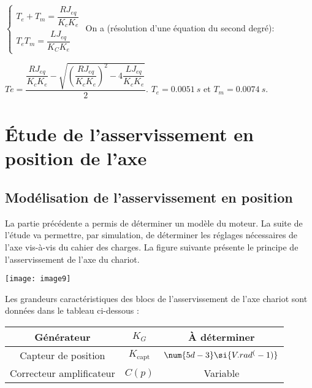 \begin{multicols}{2}
\ifprof
\begin{corrige}
$
\left\{
\begin{array}{l}
T_e+T_m= \dfrac{RJ_{eq}}{K_c K_e}\\
T_e T_m=\dfrac{LJ_{eq}}{K_C K_e}
\end{array}
\right.
$
On a (résolution d’une équation du second degré):

$Te=\dfrac{\dfrac{RJ_{eq}}{K_c K_e}-\sqrt{\left(\dfrac{RJ_{eq}}{K_c K_e}\right)^2 - 4\dfrac{LJ_{eq}}{K_c K_e}}}{2}$. $T_e=\SI{0,0051}{s}$ et $T_m=\SI{0,0074}{s}$.


\end{corrige}
\else
\fi
\section*{Étude de l'asservissement en position de l'axe}
\subsection*{Modélisation de l'asservissement en position}
\ifprof
\else


La partie précédente a permis de déterminer un modèle du moteur. La suite de l'étude va permettre, par simulation, de déterminer les réglages nécessaires de l'axe vis-à-vis du cahier des charges. La figure suivante présente le principe de l'asservissement de l'axe du chariot.
 
\begin{center}
\texttt{[image: image9]}
\end{center} 

Les grandeurs caractéristiques des blocs de l'asservissement de l'axe chariot sont données dans le tableau ci-dessous :
\begin{center}
\begin{tabular}{|c|c|c|}
\hline
Générateur & $K_G$ & À déterminer \\
\hline
Capteur de position	& $K_\text{capt}$ & $\num{5d-3}\si{V.rad^(-1)}$ \\
\hline
Correcteur amplificateur	 & $C(p)$ & Variable \\
\hline
\end{tabular}
\end{center}
\fi

\ifprof
\begin{corrige} ~\\


\end{corrige}
\end{multicols}
